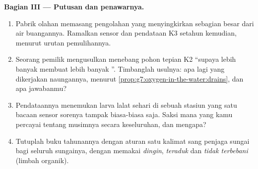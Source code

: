 \begin{problem}
\medskip\noindent\textbf{Bagian III --- Putusan dan
penawarnya.}
\begin{enumerate}[resume]
  \item Pabrik olahan  memasang pengolahan yang menyingkirkan
        sebagian besar  dari air buangannya. Ramalkan
        sensor dan pendataan K3 setahun kemudian, menurut urutan
        pemulihannya.
  \item Seorang pemilik  mengusulkan menebang pohon tepian K2
        ``supaya lebih banyak  membuat lebih banyak ''.
        Timbanglah usulnya: apa lagi yang dikerjakan naungannya,
        menurut \cref{prop:g7:oxygen-in-the-water:drains}, dan apa
        jawabanmu?
  \item Pendataannya menemukan larva lalat sehari di sebuah stasiun
        yang satu bacaan sensor sorenya tampak biasa-biasa saja. Saksi
        mana yang kamu percayai tentang musimnya secara keseluruhan,
        dan mengapa?
  \item Tutuplah buku tahunannya dengan aturan satu kalimat sang
        penjaga sungai bagi seluruh sungainya, dengan memakai
        \emph{dingin}, \emph{teraduk} dan \emph{tidak terbebani}
        (limbah organik).
\end{enumerate}
\end{problem}
